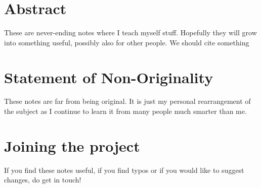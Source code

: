 \section*{Abstract}
These are never-ending notes where I teach myself stuff. 
Hopefully they will grow into something useful, possibly also for other people.
We should cite something \cite{ArchidiaconoCastorinaRedigoloSalvioni_UnveilingDarkFifthForcesLinearCosmology_2022}


\section*{Statement of Non-Originality}
These notes are far from being original.
It is just my personal rearrangement of the subject as I continue to learn it from many people much smarter than me.

\section*{Joining the project}
If you find these notes useful, if you find typos or if you would like to suggest changes, do get in touch!
